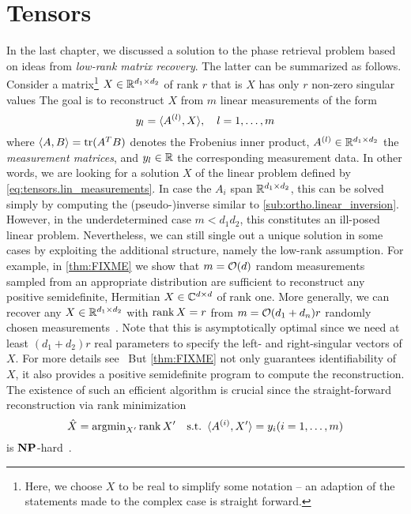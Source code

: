 \chapter{Tensors}
\label{chap:tensors}

In the last chapter, we discussed a solution to the phase retrieval problem based on ideas from \emph{low-rank matrix recovery}.
The latter can be summarized as follows.
Consider a matrix\footnote{%
  Here, we choose $X$ to be real to simplify some notation -- an adaption of the statements made to the complex case is straight forward.
}
$X \in {\mathbb{R}}^{d_1 \times d_2}$ of rank $r$ that is $X$ has only $r$ non-zero singular values
The goal is to reconstruct $X$ from $m$ linear measurements of the form
\[
  y_l = {\braket{A^{(l)}, X}}, \quad l=1,\ldots,m
  \label{eq:tensors.lin_measurements}
\]
where $\braket{A, B} = \operatorname{tr} ({{A}^T} B)$ denotes the Frobenius inner product, $A^{(l)} \in {\mathbb{R}}^{d_1 \times d_2}$ the \emph{measurement matrices}, and $y_l \in {\mathbb{R}}$ the corresponding measurement data.
In other words, we are looking for a solution $X$ of the linear problem defined by \cref{eq:tensors.lin_measurements}.
In case the $A_i$ span ${\mathbb{R}}^{d_1 \times d_2}$, this can be solved simply by computing the (pseudo-)inverse similar to \cref{sub:ortho.linear_inversion}.
However, in the underdetermined case $m < d_1 d_2$, this constitutes an ill-posed linear problem.
Nevertheless, we can still single out a unique solution in some cases by exploiting the additional structure, namely the low-rank assumption.
For example, in \cref{thm:FIXME} we show that $m = {\mathcal{O}}(d)$ random measurements sampled from an appropriate distribution are sufficient to reconstruct any positive semidefinite, Hermitian $X \in {\mathbb{C}}^{d \times d}$ of rank one.
More generally, we can recover any $X \in {\mathbb{R}}^{d_1 \times d_2}$ with $\operatorname{rank} X = r$ from $m = {\mathcal{O}}(d_1 + d_n) r$ randomly chosen measurements~\cite{FIXME}.
Note that this is asymptotically optimal since we need at least $(d_1 + d_2) r$ real parameters to specify the left- and right-singular vectors of $X$.
For more details see~\cite{Li_Paper}
But \cref{thm:FIXME} not only guarantees identifiability of $X$, it also provides a positive semidefinite program to compute the reconstruction.
The existence of such an efficient algorithm is crucial since the straight-forward reconstruction via rank minimization
\[
  \hat{X} = \operatorname{argmin}_{X'} \operatorname{rank} X' \quad\mathrm{s.t.}\ \braket{A^{(i)}, X'} = y_i (i = 1, \ldots, m)
\]
is $\mathbf{NP}$-hard~\cite{FIXME}.


